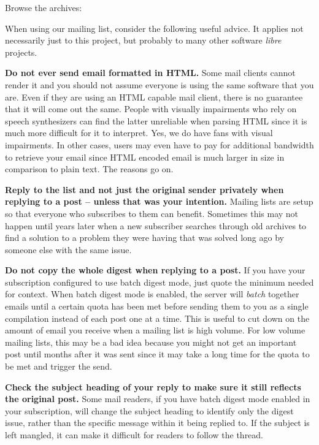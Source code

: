\blank[2*big]
Browse the archives:\crlf
{}
\stopnarrower
\crlf

When using our mailing list, consider the following useful advice. It applies not necessarily just to this project, but probably to many other software {\it libre} projects.

\startitemize[4]
\item
{\bf Do not ever send email formatted in HTML.} Some mail clients cannot render it and you should not assume everyone is using the same software that you are. Even if they are using an HTML capable mail client, there is no guarantee that it will come out the same. People with visually impairments who rely on speech synthesizers can find the latter unreliable when parsing HTML since it is much more difficult for it to interpret. Yes, we do have fans with visual impairments. In other cases, users may even have to pay for additional bandwidth to retrieve your email since HTML encoded email is much larger in size in comparison to plain text. The reasons go on.

\item
{\bf Reply to the list and not just the original sender privately when replying to a post -- unless that was your intention.} Mailing lists are setup so that everyone who subscribes to them can benefit. Sometimes this may not happen until years later when a new subscriber searches through old archives to find a solution to a problem they were having that was solved long ago by someone else with the same issue.

\item
{\bf Do not copy the whole digest when replying to a post.} If you have your subscription configured to use batch digest mode, just quote the minimum needed for context. When batch digest mode is enabled, the server will {\it batch} together emails until a certain quota has been met before sending them to you as a single compilation instead of each post one at a time. This is useful to cut down on the amount of email you receive when a mailing list is high volume. For low volume mailing lists, this may be a bad idea because you might not get an important post until months after it was sent since it may take a long time for the quota to be met and trigger the send.

\item
{\bf Check the subject heading of your reply to make sure it still reflects the original post.} Some mail readers, if you have batch digest mode enabled in your subscription, will change the subject heading to identify only the digest issue, rather than the specific message within it being replied to. If the subject is left mangled, it can make it difficult for readers to follow the thread.


